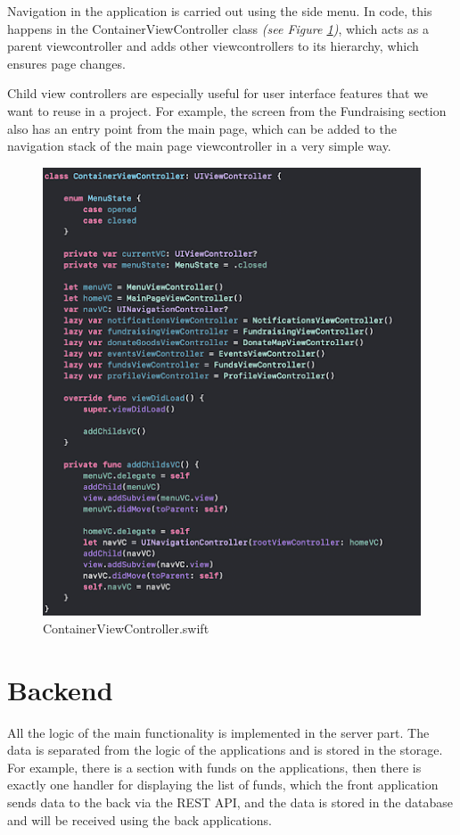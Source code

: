 Navigation in the application is carried out using the side menu. In code, this happens in the ContainerViewController class \textit{(see Figure \ref{fig:ContainerViewController})}, which acts as a parent viewcontroller and adds other viewcontrollers to its hierarchy, which ensures page changes.

Child view controllers are especially useful for user interface features that we want to reuse in a project. For example, the screen from the Fundraising section also has an entry point from the main page, which can be added to the navigation stack of the main page viewcontroller in a very simple way.

\begin{figure}[h]
    \centering
    \includegraphics[scale=0.45]{figures/iOS/ios4.png}
    \caption{ContainerViewController.swift}
    \label{fig:ContainerViewController}
\end{figure}

\section{Backend}

    All the logic of the main functionality is implemented in the server part. The data is separated from the logic of the applications and is stored in the storage. For example, there is a section with funds on the applications, then there is exactly one handler for displaying the list of funds, which the front application sends data to the back via the REST API, and the data is stored in the database and will be received using the back applications.

